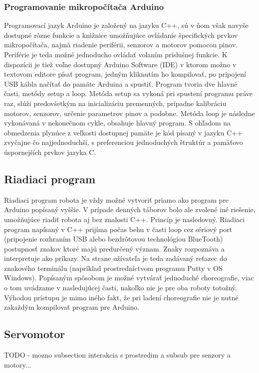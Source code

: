 \subsubsection{Programovanie mikropočítača Arduino}
Programovací jazyk Arduino je založený na jazyku C++, sú v ňom však navyše dostupné rôzne funkcie a knižnice umožňujúce ovládanie špecifických prvkov mikropočítača, najmä riadenie periférii, senzorov a motorov pomocou pinov. \cite{ArduinoLanguage} Periférie je teda možné jednoducho ovládať volaním príslušnej funkcie. K dispozícii je tiež voľne dostupný Arduino Software (IDE) v ktorom možno v textovom editore písať program, jedným kliknutím ho kompilovať, po pripojení USB kábla načítať do pamäte Arduina a spustiť. Program tvoria dve hlavné časti, metódy setup a loop. Metóda setup sa vykoná pri spustení programu práve raz, slúži predovšetkým na  inicializáciu premenných, prípadne kalibráciu motorov, senzorov, určenie parametrov pinov a podobne. Metóda loop je následne vykonávaná v nekonečnom cykle, obsahuje hlavný program. S ohľadom na obmedzenia plynúce z veľkosti dostupnej pamäte je kód písaný v jazyku C++ zvyčajne čo najjednoduchší, s preferenciou jednoduchých štruktúr a pamäťovo úspornejších prvkov jazyka C.

\subsection{Riadiaci program}
Riadiaci program robota je vždy možné vytvoriť priamo ako program pre Arduino popísaný vyššie. V prípade denných táborov bolo ale zvolené iné riešenie, umožňujúce riadiť robota aj bez znalosti C++. Princíp je nasledovný. Riadiaci program napísaný v C++ prijíma počas behu v časti loop cez sériový port (pripojenie rozhraním USB alebo bezdrôtovou technológiou BlueTooth) postupnosť znakov ktoré majú predurčený význam. Znaky rozpoznáva a interpretuje ako príkazy. Na strane užívateľa je teda zadávaný reťazec do znakového terminálu (napríklad prostredníctvom programu Putty v OS Windows). Popísaným spôsobom je možné vytvárať jednoduché choreografie, viac o tom uvádzame v nasledujúcej časti, nakoľko nie je pre oba roboty totožný. Výhodou prístupu je mimo iného fakt, že pri ladení choreografie nie je nutné zakaždým kompilovať program pre Arduino. 

\subsection{Servomotor}
TODO - mozno subsection interakcia s prostredim a subsub pre senzory a motory...


